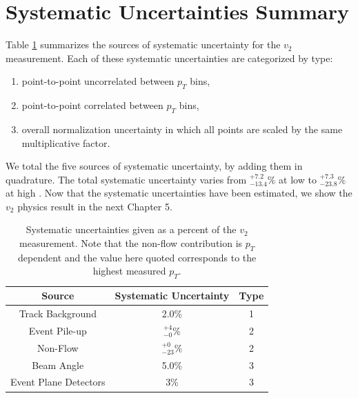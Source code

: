 \section{Systematic Uncertainties Summary}
Table \ref{tbl:sys_uncert} summarizes the sources of systematic uncertainty for the $v_2$ measurement. Each of these systematic uncertainties are categorized by type:
\begin{enumerate}
\item point-to-point uncorrelated between $p_T$ bins,
\item point-to-point correlated between $p_T$ bins,
\item overall normalization uncertainty in which all points are scaled by the same multiplicative factor.
\end{enumerate}
We total the five sources of systematic uncertainty, by adding them in quadrature. The total systematic uncertainty varies from $^{+7.2}_{-13.4}\%$ at low \pt to $^{+7.3}_{-23.8}\%$ at high \pt. Now that the systematic uncertainties have been estimated, we show the $v_2$ physics result in the next Chapter 5.

\begin{table}[!h]
  \begin{center}
  \caption{\label{t:sys}Systematic uncertainties given as a percent of the $v_2$ measurement. Note that the non-flow contribution is $p_T$ dependent and the value here quoted corresponds to the highest measured $p_T$.}
    \begin{tabular}{ccc}
      \hline
      \hline
      Source& Systematic Uncertainty & Type \\ \hline
      Track Background &2.0\%& 1\\ 
      Event Pile-up    &$^{+4}_{-0}\%$& 2\\
      Non-Flow    &$^{+0}_{-23}\%$& 2\\
      Beam Angle &5.0\%& 3\\  
      Event Plane Detectors & 3\% & 3\\
    \hline
    \hline
    \end{tabular}
   \end{center}
   \label{tbl:sys_uncert}
 \end{table}



